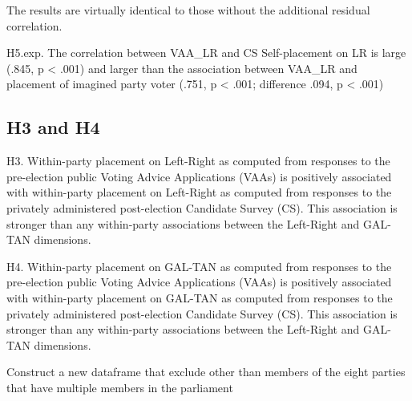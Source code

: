 \documentclass[
]{article}
\newenvironment{Shaded}{\begin{snugshade}}{\end{snugshade}}
\newcommand{\KeywordTok}[1]{\textcolor[rgb]{0.13,0.29,0.53}{\textbf{#1}}}
\newcommand{\NormalTok}[1]{#1}
\newcommand{\OperatorTok}[1]{\textcolor[rgb]{0.81,0.36,0.00}{\textbf{#1}}}
\newcommand{\StringTok}[1]{\textcolor[rgb]{0.31,0.60,0.02}{#1}}
\begin{document}
The results are virtually identical to those without the additional
residual correlation.

H5.exp. The correlation between VAA\_LR and CS Self-placement on LR is
large (.845, p \textless{} .001) and larger than the association between
VAA\_LR and placement of imagined party voter (.751, p \textless{} .001;
difference .094, p \textless{} .001)

\newpage

\hypertarget{h3-and-h4}{%
\subsection{H3 and H4}\label{h3-and-h4}}

H3. Within-party placement on Left-Right as computed from responses to
the pre-election public Voting Advice Applications (VAAs) is positively
associated with within-party placement on Left-Right as computed from
responses to the privately administered post-election Candidate Survey
(CS). This association is stronger than any within-party associations
between the Left-Right and GAL-TAN dimensions.

H4. Within-party placement on GAL-TAN as computed from responses to the
pre-election public Voting Advice Applications (VAAs) is positively
associated with within-party placement on GAL-TAN as computed from
responses to the privately administered post-election Candidate Survey
(CS). This association is stronger than any within-party associations
between the Left-Right and GAL-TAN dimensions.

Construct a new dataframe that exclude other than members of the eight
parties that have multiple members in the parliament

\begin{Shaded}
\end{Shaded}
\end{document}
